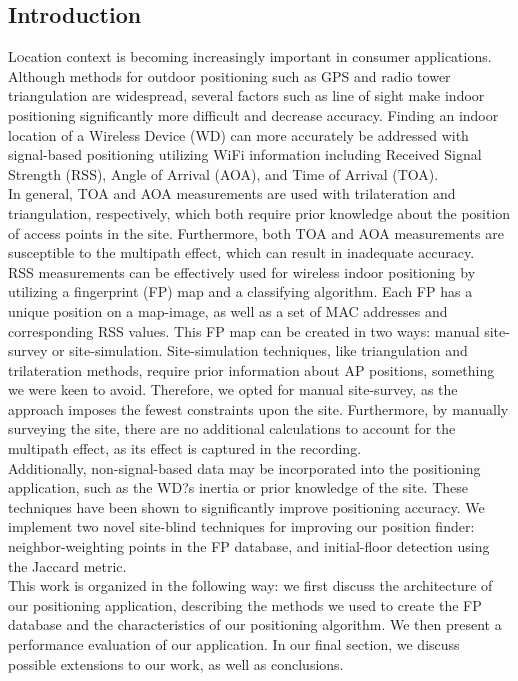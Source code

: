 \documentclass[twoside]{article}
\begin{document}
\begin{multicols}{2} %

\section{Introduction}
\lettrine[nindent=0em,lines=3]{L}ocation context is becoming increasingly important in consumer applications. Although methods for outdoor positioning such as GPS and radio tower triangulation are widespread, several factors such as line of sight make indoor positioning significantly more difficult and decrease accuracy. Finding an indoor location of a Wireless Device (WD) can more accurately be addressed with signal-based positioning utilizing WiFi information including Received Signal Strength (RSS), Angle of Arrival (AOA), and Time of Arrival (TOA).\\
\indent In general, TOA and AOA measurements are used with trilateration and triangulation, respectively, which both require prior knowledge about the position of access points in the site. Furthermore, both TOA and AOA measurements are susceptible to the multipath effect, which can result in inadequate accuracy. \\
\indent RSS measurements can be effectively used for wireless indoor positioning by utilizing a fingerprint (FP) map and a classifying algorithm. Each FP has a unique position on a map-image, as well as a set of MAC addresses and corresponding RSS values. This FP map can be created in two ways: manual site-survey or site-simulation. Site-simulation techniques, like triangulation and trilateration methods, require prior information about AP positions, something we were keen to avoid. Therefore, we opted for manual site-survey, as the approach imposes the fewest constraints upon the site. Furthermore, by manually surveying the site, there are no additional calculations to account for the multipath effect, as its effect is captured in the recording.\\
\indent Additionally, non-signal-based data may be incorporated into the positioning application, such as the WD?s inertia or prior knowledge of the site. These techniques have been shown to significantly improve positioning accuracy. We implement two novel site-blind techniques for improving our position finder: neighbor-weighting points in the FP database, and initial-floor detection using the Jaccard metric.\\
\indent This work is organized in the following way: we first discuss the architecture of our positioning application, describing the methods we used to create the FP database and the characteristics of our positioning algorithm. We then present a performance evaluation of our application. In our final section, we discuss possible extensions to our work, as well as conclusions. 


\end{multicols}
\end{document}
